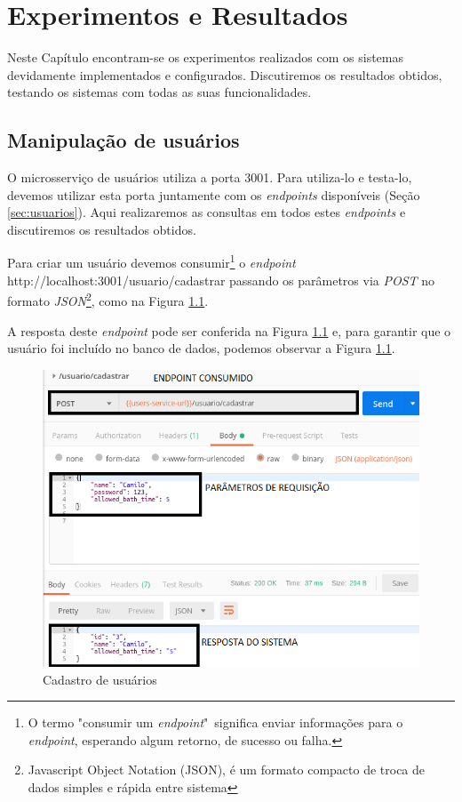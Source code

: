 \chapter{Experimentos e Resultados}

Neste Capítulo encontram-se os experimentos realizados com os sistemas devidamente implementados e configurados. Discutiremos os resultados obtidos, testando os sistemas com todas as suas funcionalidades.

\section{Manipulação de usuários}

O microsserviço de usuários utiliza a porta 3001. Para utiliza-lo e testa-lo, devemos utilizar esta porta juntamente com os \textit{endpoints} disponíveis (Seção \ref{sec:usuarios}). Aqui realizaremos as consultas em todos estes \textit{endpoints} e discutiremos os resultados obtidos.

Para criar um usuário devemos consumir\footnote{O termo "consumir um \textit{endpoint}"\  significa enviar informações para o \textit{endpoint}, esperando algum retorno, de sucesso ou falha.} o \textit{endpoint} http://localhost:3001/usuario/cadastrar passando os parâmetros via \textit{POST} no formato \textit{JSON}\footnote{Javascript Object Notation (JSON), é um formato compacto de troca de dados simples e rápida entre sistema}, como na Figura \ref{fig:cadastro}.

A resposta deste \textit{endpoint} pode ser conferida na Figura \ref{fig:cadastro} e, para garantir que o usuário foi incluído no banco de dados, podemos observar a Figura \ref{fig:cadastro}.

\begin{figure}[htbp]
	\centering
	\includegraphics[width=0.7\linewidth]{figuras/postman/cadastro.png}
	\caption{Cadastro de usuários}
	\label{fig:cadastro}
\end{figure}

